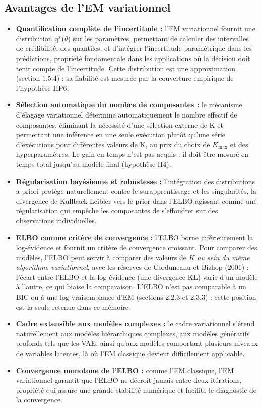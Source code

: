 \subsection{Avantages de l'EM variationnel}
\begin{itemize}
\item \textbf{Quantification complète de l'incertitude : }l'EM variationnel fournit une distribution q*($\theta $) sur les paramètres, permettant de calculer des intervalles de crédibilité, des quantiles, et d'intégrer l'incertitude paramétrique dans les prédictions, propriété fondamentale dans les applications où la décision doit tenir compte de l'incertitude. Cette distribution est une approximation (section 1.5.4) : sa fiabilité est mesurée par la couverture empirique de l'hypothèse HP6.
\item \textbf{Sélection automatique du nombre de composantes : }le mécanisme d'élagage variationnel détermine automatiquement le nombre effectif de composantes, éliminant la nécessité d'une sélection externe de K et permettant une inférence en une seule exécution plutôt qu'une série d'exécutions pour différentes valeurs de K, au prix du choix de $K_{\max}$ et des hyperparamètres. Le gain en temps n'est pas acquis : il doit être mesuré en temps total jusqu'au modèle final (hypothèse H4).
\item \textbf{Régularisation bayésienne et robustesse : }l'intégration des distributions a priori protège naturellement contre le surapprentissage et les singularités, la divergence de Kullback-Leibler vers le prior dans l'ELBO agissant comme une régularisation qui empêche les composantes de s'effondrer sur des observations individuelles.
\item \textbf{ELBO comme critère de convergence : }l'ELBO borne inférieurement la log-évidence et fournit un critère de convergence croissant. Pour comparer des modèles, l'ELBO peut servir à comparer des valeurs de $K$ \emph{au sein du même algorithme variationnel}, avec les réserves de Corduneanu et Bishop (2001) : l'écart entre l'ELBO et la log-évidence (une divergence KL) varie d'un modèle à l'autre, ce qui biaise la comparaison. L'ELBO n'est pas comparable à un BIC ou à une log-vraisemblance d'EM (sections 2.2.3 et 2.3.3) : cette position est la seule retenue dans ce mémoire.
\item \textbf{Cadre extensible aux modèles complexes : }le cadre variationnel s'étend naturellement aux modèles hiérarchiques complexes, aux modèles génératifs profonds tels que les VAE, ainsi qu'aux modèles comportant plusieurs niveaux de variables latentes, là où l'EM classique devient difficilement applicable.
\item \textbf{Convergence monotone de l'ELBO : }comme l'EM classique, l'EM variationnel garantit que l'ELBO ne décroît jamais entre deux itérations, propriété qui assure une grande stabilité numérique et facilite le diagnostic de la convergence.
\end{itemize}
